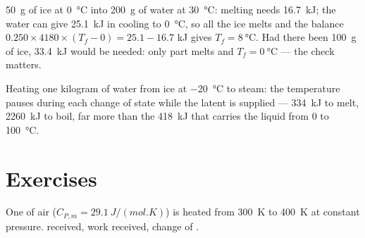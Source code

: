 \begin{example}\label{ex:b1:first-law:ice}
\qty{50}{g} of ice at \qty{0}{\degreeCelsius} into \qty{200}{g} of water at
\qty{30}{\degreeCelsius}: melting needs \qty{16.7}{kJ}; the water can give
\qty{25.1}{kJ} in cooling to \qty{0}{\degreeCelsius}, so all the ice melts
and the balance $0.250 \times 4180 \times (T_f - 0) = 25.1 - 16.7$ kJ gives
$T_f = \qty{8}{\degreeCelsius}$. Had there been \qty{100}{g} of ice,
\qty{33.4}{kJ} would be needed: only part melts and $T_f = \qty{0}{\degreeCelsius}$
--- the check matters.
\end{example}

\begin{omfigure}

{\small Heating one kilogram of water from ice at \qty{-20}{\degreeCelsius}
to steam: the temperature pauses during each change of state while the
latent  is supplied --- \qty{334}{kJ} to melt, \qty{2260}{kJ} to boil,
far more than the \qty{418}{kJ} that carries the liquid from \qty{0}{} to
\qty{100}{\degreeCelsius}.}
\end{omfigure}

\section{Exercises}

\begin{exercise}[$\star$]\label{exo:b1:first-law:1}
One  of air ($C_{P,m} = \qty{29.1}{J/(mol.K)}$) is heated from
\qty{300}{K} to \qty{400}{K} at constant pressure.  received, work
received, change of .
\end{exercise}

